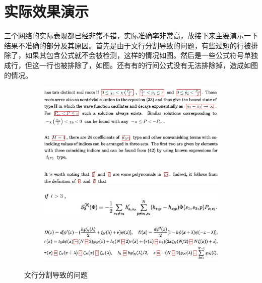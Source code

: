 \section{实际效果演示}
\noindent

三个网络的实际表现都已经非常不错，实际准确率非常高，故接下来主要演示一下结果不准确的部分及其原因。首先是由于文行分割导致的问题，有些过短的行被排除了，如果其包含公式就不会被检测，这样的情况如图。然后是一些公式符号单独成行，但这一行也被排除了，如图。还有有的行间公式没有无法排除掉，造成如图的情况。
\begin{figure}[hp]
    \centering
    \begin{subfigure}[b]{\linewidth}
    \centering
    \includegraphics[scale=0.3]{eps/a11.eps}
    \caption{\label{fig:fig1}}
    \end{subfigure}

    \begin{subfigure}[b]{\linewidth}
    \centering
    \includegraphics[scale=0.3]{eps/a12.eps}
    \caption{\label{fig:fig2}}
    \end{subfigure}

    \begin{subfigure}[b]{\linewidth}
    \centering   
    \includegraphics[scale=0.3]{eps/a13.eps}
    \caption{\label{fig:fig3}}
    \end{subfigure}

    \begin{subfigure}[b]{\linewidth}
    \centering 
    \includegraphics[scale=0.3]{eps/a14.eps}
    \caption{\label{fig:fig4}}
    \end{subfigure}

    \begin{subfigure}[b]{\linewidth}
    \centering 
    \includegraphics[scale=0.3]{eps/a15.eps}
    \caption{\label{fig:fig5}}
    \end{subfigure}

    \caption{文行分割导致的问题}
    \label{fig:label}
\end{figure}

